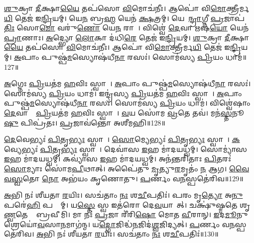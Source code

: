 \ul{𑌶𑍁}𑌕𑍍𑌰𑌾 \ul{𑌦𑍀}𑌕𑍍𑌷𑌾\ul{𑌯𑍈} 𑌤𑌪॑𑌸𑍋 \ul{𑌵𑌿}𑌮𑍋𑌚॑𑌨𑍀𑌃।
𑌆𑌪𑍋॑ 𑌵𑌿\ul{𑌮𑍋}𑌕𑍍𑌤𑍍𑌰𑍀𑌰𑍍𑌮\ul{𑌯𑌿} 𑌤𑍇𑌜॑ 𑌇\ul{𑌨𑍍𑌦𑍍𑌰𑌿}𑌯𑌮𑍍।
𑌯𑍇\ul{𑌨} 𑌬𑍍𑌰\ul{𑌹𑍍𑌮} 𑌯𑍇𑌨॑ \ul{𑌕𑍍𑌷}𑌤𑍍𑌰𑌮𑍍।
𑌯𑍇𑌨𑍇᳚\ul{𑌨𑍍𑌦𑍍𑌰𑌾}𑌗𑍍𑌨𑍀 \ul{𑌪𑍍𑌰}𑌜𑌾𑌪॑\ul{𑌤𑌿𑌃} 𑌸𑍋\ul{𑌮𑍋} 𑌵𑌰𑍁॑\ul{𑌣𑍋} 𑌯𑍇\ul{𑌨} 𑌰𑌾𑌜𑌾᳚।
𑌵𑌿𑌶𑍍𑌵𑍇॑ \ul{𑌦𑍇}𑌵𑌾 𑌋𑌷॑\ul{𑌯𑍋} 𑌯𑍇𑌨॑ \ul{𑌪𑍍𑌰𑌾}𑌣𑌾𑌃।
\ul{𑌅}𑌦𑍍𑌭𑍍𑌯𑍋 \ul{𑌲𑍋}𑌕𑌾 𑌦॑𑌧𑌿\ul{𑌰𑍇} 𑌤𑍇𑌜॑ 𑌇\ul{𑌨𑍍𑌦𑍍𑌰𑌿}𑌯𑌮𑍍।
\ul{𑌶𑍁}𑌕𑍍𑌰𑌾 \ul{𑌦𑍀}𑌕𑍍𑌷𑌾\ul{𑌯𑍈} 𑌤𑌪॑𑌸𑍋 \ul{𑌵𑌿}𑌮𑍋𑌚॑𑌨𑍀𑌃।
𑌆𑌪𑍋॑ 𑌵𑌿\ul{𑌮𑍋}𑌕𑍍𑌤𑍍𑌰𑍀𑌰𑍍𑌮\ul{𑌯𑌿} 𑌤𑍇𑌜॑ 𑌇\ul{𑌨𑍍𑌦𑍍𑌰𑌿}𑌯𑌮𑍍।
\ul{𑌅}𑌪𑌾𑌂 𑌪𑍁𑌷𑍍𑌪॑\ul{𑌮}𑌸𑍍𑌯𑍋𑌷॑𑌧𑍀\ul{𑌨𑌾}\ul{} 𑌰𑌸𑌃॑।
𑌸𑍋𑌮॑𑌸𑍍𑌯 \ul{𑌪𑍍𑌰𑌿}𑌯𑌂 𑌧𑌾𑌮॑॥127॥

\ul{𑌅}𑌗𑍍𑌨𑍇𑌃 \ul{𑌪𑍍𑌰𑌿}𑌯𑌤॑𑌮 \ul{𑌹}𑌵𑌿𑌃 𑌸𑍍𑌵𑌾𑌹𑌾᳚।
\ul{𑌅}𑌪𑌾𑌂 𑌪𑍁𑌷𑍍𑌪॑\ul{𑌮}𑌸𑍍𑌯𑍋𑌷॑𑌧𑍀\ul{𑌨𑌾}\ul{} 𑌰𑌸𑌃॑।
𑌸𑍋𑌮॑𑌸𑍍𑌯 \ul{𑌪𑍍𑌰𑌿}𑌯𑌂 𑌧𑌾𑌮॑।
𑌇𑌨𑍍𑌦𑍍𑌰॑𑌸𑍍𑌯 \ul{𑌪𑍍𑌰𑌿}𑌯𑌤॑𑌮 \ul{𑌹}𑌵𑌿𑌃 𑌸𑍍𑌵𑌾𑌹𑌾᳚।
\ul{𑌅}𑌪𑌾𑌂 𑌪𑍁𑌷𑍍𑌪॑\ul{𑌮}𑌸𑍍𑌯𑍋𑌷॑𑌧𑍀\ul{𑌨𑌾}\ul{} 𑌰𑌸𑌃॑।
𑌸𑍋𑌮॑𑌸𑍍𑌯 \ul{𑌪𑍍𑌰𑌿}𑌯𑌂 𑌧𑌾𑌮॑।
𑌵𑌿𑌶𑍍𑌵𑍇॑𑌷𑌾𑌂 \ul{𑌦𑍇}𑌵𑌾𑌨𑌾𑌂᳚ \ul{𑌪𑍍𑌰𑌿}𑌯𑌤॑𑌮 \ul{𑌹}𑌵𑌿𑌃 𑌸𑍍𑌵𑌾𑌹𑌾᳚।
\ul{𑌵}𑌯 𑌸𑍋॑𑌮 \ul{𑌵𑍍𑌰}𑌤𑍇 𑌤𑌵॑।
𑌮𑌨॑\ul{𑌸𑍍𑌤}𑌨𑍂\ul{𑌷𑍁} 𑌪𑌿𑌪𑍍𑌰॑𑌤𑌃।
\ul{𑌪𑍍𑌰}𑌜𑌾𑌵॑𑌨𑍍𑌤𑍋 𑌅𑌶𑍀𑌮𑌹𑌿॥128॥

\ul{𑌦𑍇}𑌵𑍇𑌭𑍍𑌯𑌃॑ \ul{𑌪𑌿}𑌤𑍃\ul{𑌭𑍍𑌯𑌃} 𑌸𑍍𑌵𑌾𑌹𑌾᳚।
\ul{𑌸𑍋}𑌮𑍍𑌯𑍇𑌭𑍍𑌯𑌃॑ \ul{𑌪𑌿}𑌤𑍃\ul{𑌭𑍍𑌯𑌃} 𑌸𑍍𑌵𑌾𑌹𑌾᳚।
\ul{𑌕}𑌵𑍍𑌯𑍇𑌭𑍍𑌯𑌃॑ \ul{𑌪𑌿}𑌤𑍃\ul{𑌭𑍍𑌯𑌃} 𑌸𑍍𑌵𑌾𑌹𑌾᳚।
𑌦𑍇𑌵𑌾॑𑌸 \ul{𑌇}𑌹 𑌮𑌾॑𑌦𑌯𑌧𑍍𑌵𑌮𑍍।
𑌸𑍋𑌮𑍍𑌯𑌾॑𑌸 \ul{𑌇}𑌹 𑌮𑌾॑𑌦𑌯𑌧𑍍𑌵𑌮𑍍।
𑌕𑌵𑍍𑌯𑌾॑𑌸 \ul{𑌇}𑌹 𑌮𑌾॑𑌦𑌯𑌧𑍍𑌵𑌮𑍍।
𑌅𑌨॑𑌨𑍍𑌤𑌰𑌿𑌤𑌾𑌃 \ul{𑌪𑌿}𑌤𑌰𑌃॑ \ul{𑌸𑍋}𑌮𑍍𑌯𑌾𑌃 𑌸𑍋॑𑌮\ul{𑌪𑍀}𑌥𑌾𑌤𑍍।
𑌅𑌪𑍈॑𑌤𑍁 \ul{𑌮𑍃}𑌤𑍍𑌯𑍁\ul{𑌰}𑌮𑍃𑌤𑌂॑ \ul{𑌨} 𑌆𑌗\sn{}।
\ul{𑌵𑍈}\ul{𑌵}\ul{𑌸𑍍𑌵}𑌤𑍋 \ul{𑌨𑍋} 𑌅𑌭॑𑌯𑌂 𑌕𑍃𑌣𑍋𑌤𑍁।
\ul{𑌪}𑌰𑍍𑌣𑌂 𑌵\ul{𑌨}𑌸𑍍𑌪𑌤𑍇॑𑌰𑌿𑌵॥129॥

\ul{𑌅}𑌭𑌿 𑌨𑌃॑ 𑌶𑍀𑌯𑌤𑌾 \ul{𑌰}𑌯𑌿𑌃।
𑌸𑌚॑𑌤𑌾𑌂 \ul{𑌨𑌃} 𑌶\ul{𑌚𑍀}𑌪𑌤𑌿𑌃॑।
𑌪𑌰𑌂 𑌮𑍃\ul{𑌤𑍍𑌯𑍋} 𑌅\ul{𑌨𑍁} 𑌪𑌰𑍇॑\ul{𑌹𑌿} 𑌪𑌨𑍍𑌥𑌾᳚𑌮𑍍।
𑌯\ul{𑌸𑍍𑌤𑍇} 𑌸𑍍𑌵 𑌇𑌤॑𑌰𑍋 𑌦𑍇\ul{𑌵}𑌯𑌾𑌨𑌾᳚𑌤𑍍।
𑌚𑌕𑍍𑌷𑍁॑𑌷𑍍𑌮𑌤𑍇 𑌶𑍃\ul{𑌣𑍍𑌵}𑌤𑍇 𑌤𑍇᳚ 𑌬𑍍𑌰𑌵𑍀𑌮𑌿।
𑌮𑌾 𑌨𑌃॑ \ul{𑌪𑍍𑌰}𑌜𑌾 𑌰𑍀॑𑌰𑌿\ul{𑌷𑍋} 𑌮𑍋𑌤 \ul{𑌵𑍀}𑌰𑌾𑌨𑍍।
\ul{𑌇}𑌦\ul{𑌮𑍂}𑌨𑍁 𑌶𑍍𑌰𑍇𑌯𑍋॑\ul{𑌵}𑌸𑌾\ul{𑌨}𑌮𑌾𑌗॑𑌨𑍍𑌮।
𑌯\ul{𑌦𑍍𑌗𑍋}𑌜𑌿𑌦𑍍𑌧॑\ul{𑌨}𑌜𑌿𑌦॑\ul{𑌶𑍍𑌵}𑌜𑌿𑌦𑍍𑌯𑌤𑍍।
\ul{𑌪}𑌰𑍍𑌣𑌂 𑌵\ul{𑌨}𑌸𑍍𑌪𑌤𑍇॑𑌰𑌿𑌵।
\ul{𑌅}𑌭𑌿 𑌨𑌃॑ 𑌶𑍀𑌯𑌤𑌾 \ul{𑌰}𑌯𑌿𑌃।
𑌸𑌚॑𑌤𑌾𑌂 \ul{𑌨𑌃} 𑌶\ul{𑌚𑍀}𑌪𑌤𑌿𑌃॑॥130॥\anuvakamend[𑌵\ul{𑌨}𑌸𑍍𑌪𑌤𑌾॑\ul{𑌵}𑌦𑍍𑌭𑍍𑌯𑍋 \ul{𑌲𑍋}𑌕𑌾 𑌦॑𑌧𑌿\ul{𑌰𑍇} 𑌤𑍇𑌜॑ 𑌇\ul{𑌨𑍍𑌦𑍍𑌰𑌿}𑌯𑌂 𑌧𑌾𑌮𑌾॑𑌶𑍀𑌮𑌹𑍀\ul{𑌵𑌾}𑌭𑌿𑌨𑌃॑ 𑌶𑍀𑌯𑌤𑌾\dng{ꣳ} \ul{𑌰}𑌯𑌿𑌰𑍇𑌕𑌂॑ 𑌚]




\clearpage
{}
\setcounter{anuvakam}{0}

